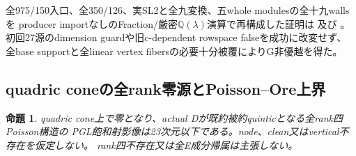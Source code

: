 \documentclass[a4paper,11pt]{ltjsarticle}
\newtheorem{proposition}{命題}[section]
\theoremstyle{definition}
\begin{document}
全975/150入口、全350/126、実SL2と全九変換、五whole modulesの全十九wallsを
producer importなしのFraction/厳密$\mathbb Q(\lambda)$演算で再構成した証明は
及び
。
初回27源のdimension guardや旧c-dependent rowspace falseを成功に改変せず、
全base supportと全linear vertex fibersの必要十分被覆によりG非優越を得た。

\subsection{quadric coneの全rank零源とPoisson--Ore上界}
\begin{proposition}\label{prop:quadric-cone-rankzero-G}
quadric cone上で零となり、actual Dが既約被約quinticとなる全rank四Poisson構造の
PGL飽和射影像は23次元以下である。node、clean又はvertical不存在を仮定しない。
rank四不存在又は全E成分帰属は主張しない。
\end{proposition}
\end{document}
